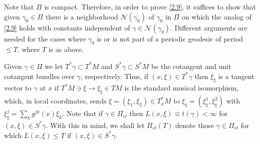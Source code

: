 \documentclass[10pt]{amsart}
\begin{document}
Note that ${\varPi}$ is compact.  Therefore, in order to prove \eqref{2.9}, it suffices
to show that given $\gamma_0\in {\varPi}$ there is a neighborhood ${\mathcal N}(\gamma_0)$
 of $\gamma_0$ in ${\varPi}$ on which the analog of \eqref{2.9} holds with
constants independent of $\gamma\in {\mathcal N}(\gamma_0)$.  Different arguments
are needed for the cases where $\gamma_0$ is or is not part of a periodic geodesic
of period $\le T$, where $T$ is as above.

Given $\gamma\in{\varPi}$ we let  $T^*\gamma\subset
T^*M$ and $S^*\gamma\subset S^*M$ be the cotangent and unit cotangent
bundles over $\gamma$, respectively.  Thus, if $(x,\xi)\in T^*\gamma$ then
$\xi_\sharp$ is a tangent vector  to $\gamma$ at $x$ if $T^*M\ni\xi\to \xi_\sharp\in TM$ is the
standard musical isomorphism, which, in local coordinates, sends $\xi=(\xi_1,\xi_2)
\in T^*_xM$ to $\xi_\sharp=(\xi_\sharp^1,\xi_\sharp^2)$ with
$\xi_\sharp^j=\sum_k g^{jk}(x)\xi_k$.  Note that if $\gamma\in {\varPi}_{cl}$ then $L(x,\xi)\equiv
t(\gamma)<\infty$ for $(x,\xi)\in S^*\gamma$.  With this in mind, we shall let ${\varPi}_{cl}(T)$ denote
those $\gamma\in {\varPi}_{cl}$ for which $L(x,\xi)\le T$ if $(x,\xi)\in S^*\gamma$.
\end{document}
